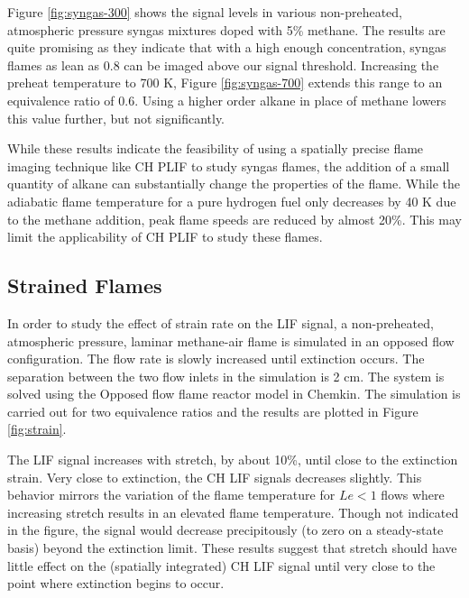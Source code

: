 Figure \ref{fig:syngas-300} shows the signal levels in various non-preheated, atmospheric pressure syngas mixtures doped with 5\% methane.
The results are quite promising as they indicate that with a high enough  concentration, syngas flames as lean as 0.8 can be imaged above our signal threshold.
Increasing the preheat temperature to 700 K, Figure \ref{fig:syngas-700} extends this range to an equivalence ratio of 0.6.
Using a higher order alkane in place of methane lowers this value further, but not significantly.




While these results indicate the feasibility of using a spatially precise flame imaging technique like CH PLIF to study syngas flames, the addition of a small quantity of alkane can substantially change the properties of the flame.
While the adiabatic flame temperature for a pure hydrogen fuel only decreases by 40 K due to the methane addition, peak flame speeds are reduced by almost 20\%.
This may limit the applicability of CH PLIF to study these flames.

\subsection{Strained Flames}

In order to study the effect of strain rate on the LIF signal, a non-preheated, atmospheric pressure, laminar methane-air flame is simulated in an opposed flow configuration.
The flow rate is slowly increased until extinction occurs.
The separation between the two flow inlets in the simulation is 2 cm.
The system is solved using the Opposed flow flame reactor model in Chemkin.
The simulation is carried out for two equivalence ratios and the results are plotted in Figure \ref{fig:strain}.




The LIF signal increases with stretch, by about 10\%, until close to the extinction strain.
Very close to extinction, the CH LIF signals decreases slightly.
This behavior mirrors the variation of the flame temperature for \(Le<1\) flows where increasing stretch results in an elevated flame temperature.
Though not indicated in the figure, the signal would decrease precipitously (to zero on a steady-state basis) beyond the extinction limit.
These results suggest that stretch should have little effect on the (spatially integrated) CH LIF signal until very close to the point where extinction begins to occur.

